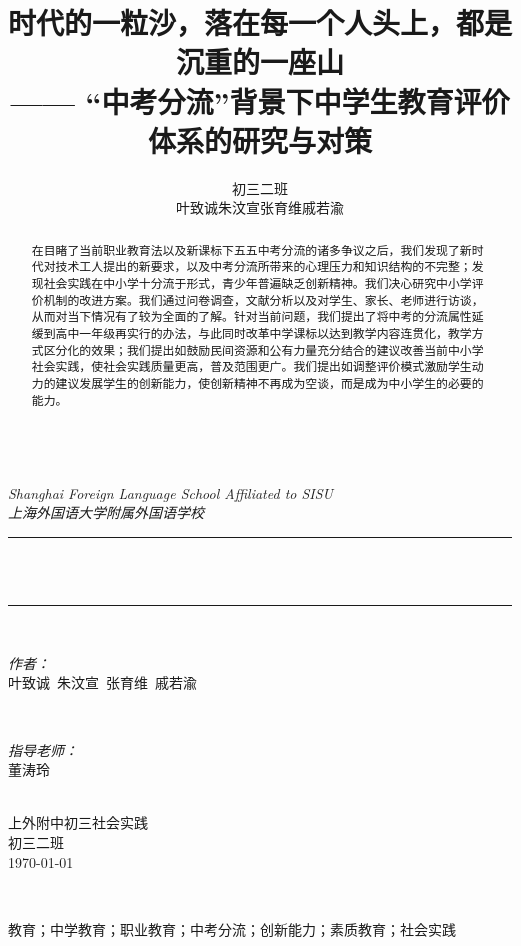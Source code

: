 \documentclass[12pt,UTF8]{ctexart}
\title{
	\textbf{\fontsize{18.2}{1} 时代的一粒沙，落在每一个人头上，都是沉重的一座山}\\
	\large{—— “中考分流”背景下中学生教育评价体系的研究与对策}
}
\author{初三二班\\叶致诚\quad 朱汶宣\quad 张育维\quad 戚若渝}
\begin{document}
\begin{titlepage}
	\newcommand{\HRule}{\rule{\linewidth}{0.5mm}}
	\center 
	\quad\\[1.5cm]
	\textsl{\Large Shanghai Foreign Language School Affiliated to SISU }\\[0.5cm] 
	\textsl{\large 上海外国语大学附属外国语学校}\\[0.5cm] 
	\makeatletter
	\HRule \\[0.45cm]
	{ \huge \bfseries \@title}\\[0.45cm] 
	\HRule \\[1.5cm]
	\begin{minipage}{0.45\textwidth}
		\begin{flushleft} \large
			\emph{作者：}\\
			叶致诚\ 朱汶宣\ 张育维\ 戚若渝
		\end{flushleft}
	\end{minipage}
	~
	\begin{minipage}{0.45\textwidth}
		\begin{flushright} \large
			\emph{指导老师：} \\
			\textup{董涛玲}
		\end{flushright}
	\end{minipage}\\[3cm]
	\makeatother
	{\large 上外附中初三社会实践}\\[0.5cm]
	{\large 初三二班}\\[0.5cm]
	{\large \today}\\[2cm] 
	\vfill 
\end{titlepage}

\maketitle
\begin{abstract}
	
	在目睹了当前职业教育法以及新课标下五五中考分流的诸多争议之后，我们发现了新时代对技术工人提出的新要求，以及中考分流所带来的心理压力和知识结构的不完整；发现社会实践在中小学十分流于形式，青少年普遍缺乏创新精神。我们决心研究中小学评价机制的改进方案。我们通过问卷调查，文献分析以及对学生、家长、老师进行访谈，从而对当下情况有了较为全面的了解。针对当前问题，我们提出了将中考的分流属性延缓到高中一年级再实行的办法，与此同时改革中学课标以达到教学内容连贯化，教学方式区分化的效果；我们提出如鼓励民间资源和公有力量充分结合的建议改善当前中小学社会实践，使社会实践质量更高，普及范围更广。我们提出如调整评价模式激励学生动力的建议发展学生的创新能力，使创新精神不再成为空谈，而是成为中小学生的必要的能力。
\end{abstract}
{\\
	\centerline{教育；中学教育；职业教育；中考分流；创新能力；素质教育；社会实践}}
\newpage
\tableofcontents
\newpage
\end{document}
